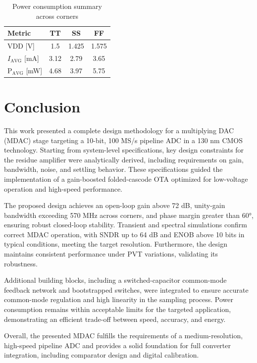 \documentclass[11pt,a4paper]{article}
\begin{document}
\begin{table}[h]
\centering
\caption{Power consumption summary across corners}
\label{tab:consumption}
\begin{tabular}{lccc}
\hline
\textbf{Metric} & \textbf{TT} & \textbf{SS} & \textbf{FF} \\
\hline
VDD [V]                        &1.5  &1.425 &1.575 \\
$I_{\text{AVG}}$ [mA]          &3.12 &2.79  &3.65 \\
P$_{\text{AVG}}$ [mW]          &4.68 &3.97  &5.75 \\
\hline
\end{tabular}
\end{table}


\section{Conclusion}
This work presented a complete design methodology for a multiplying DAC (MDAC) stage targeting a 10-bit, 100 MS/s pipeline ADC in a 130 nm CMOS technology. Starting from system-level specifications, key design constraints for the residue amplifier were analytically derived, including requirements on gain, bandwidth, noise, and settling behavior. These specifications guided the implementation of a gain-boosted folded-cascode OTA optimized for low-voltage operation and high-speed performance.

The proposed design achieves an open-loop gain above 72 dB, unity-gain bandwidth exceeding 570 MHz across corners, and phase margin greater than 60°, ensuring robust closed-loop stability. Transient and spectral simulations confirm correct MDAC operation, with SNDR up to 64 dB and ENOB above 10 bits in typical conditions, meeting the target resolution. Furthermore, the design maintains consistent performance under PVT variations, validating its robustness.

Additional building blocks, including a switched-capacitor common-mode feedback network and bootstrapped switches, were integrated to ensure accurate common-mode regulation and high linearity in the sampling process. Power consumption remains within acceptable limits for the targeted application, demonstrating an efficient trade-off between speed, accuracy, and energy.

Overall, the presented MDAC fulfills the requirements of a medium-resolution, high-speed pipeline ADC and provides a solid foundation for full converter integration, including comparator design and digital calibration.
\end{document}
